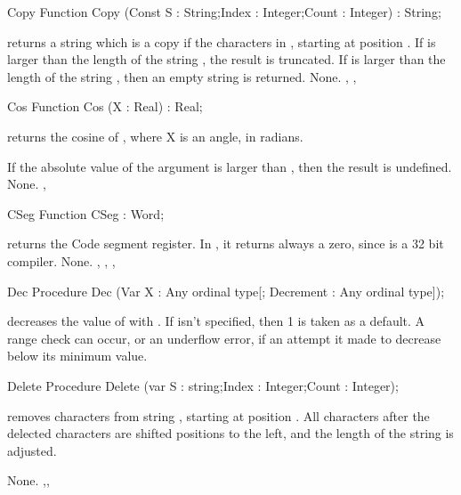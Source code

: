 

\begin{function}{Copy}
\Declaration
Function Copy (Const S : String;Index : Integer;Count : Integer) : String;

\Description
{} returns a string which is a copy if the  characters
in , starting at position . If  is larger than
the length of the string , the result is truncated.
If  is larger than the length of the string , then an
empty string is returned.
\Errors
None.
\SeeAlso
{}, , 
\end{function}


\begin{function}{Cos}
\Declaration
Function Cos (X : Real) : Real;

\Description
{} returns the cosine of , where X is an angle, in radians.

If the absolute value of the argument is larger than , then the
result is undefined.
\Errors
None.
\SeeAlso
{}, 
\end{function}


\begin{function}{CSeg}
\Declaration
Function CSeg  : Word;

\Description
{} returns the Code segment register. In \fpc, it returns always a
zero, since \fpc is a 32 bit compiler.
\Errors
None.
\SeeAlso
{}, , , 
\end{function}


\begin{procedure}{Dec}
\Declaration
Procedure Dec (Var X : Any ordinal type[; Decrement : Any ordinal type]);

\Description
{} decreases the value of  with .
If  isn't specified, then 1 is taken as a default.
\Errors
A range check can occur, or an underflow error, if an attempt it made
to decrease  below its minimum value.
\SeeAlso
{}
\end{procedure}


\begin{procedure}{Delete}
\Declaration
Procedure Delete (var S : string;Index : Integer;Count : Integer);

\Description
{} removes  characters from string , starting
at position . All characters after the delected characters are
shifted  positions to the left, and the length of the string is adjusted.

\Errors
None.
\SeeAlso
{},,
\end{procedure}

